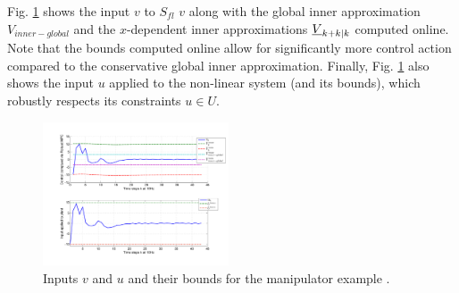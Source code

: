 
Fig. \ref{fig:v_and_limits} shows the input $v$ to $S_{fl}$ $v$ along with the global inner approximation $V_{inner-global}$ and the $x$-dependent inner approximations $\underline{V}_{k+k|k}$ computed online.
Note that the bounds computed online allow for significantly more control action compared to the conservative global inner approximation. 
Finally, Fig. \ref{fig:v_and_limits} also shows the input $u$ applied to the non-linear system (and its bounds), which robustly respects its constraints $u \in U$.



\begin{figure}
\includegraphics[width=0.49\textwidth]{figs/u_and_v_manip.pdf}
\caption{Inputs $v$ and $u$ and their bounds for the manipulator example .}
\label{fig:v_and_limits}
\end{figure}






